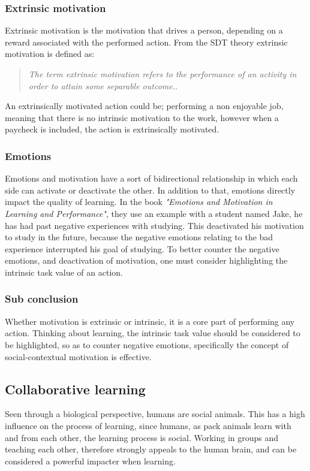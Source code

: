 \subsubsection*{Extrinsic motivation}
Extrinsic motivation is the motivation that drives a person, depending on a reward associated with the performed action. From the SDT theory extrinsic motivation is defined as: 
\begin{quote}
	\textit{The term extrinsic motivation refers to the performance of an activity in order to attain some separable outcome.}\cite[p.~71]{SDT}.\\
\end{quote}
An extrinsically motivated action could be; performing a non enjoyable job, meaning that there is no intrinsic motivation to the work, however when a paycheck is included, the action is extrinsically motivated\cite{SDT}.

\subsubsection*{Emotions}
Emotions and motivation have a sort of bidirectional relationship in which each side can activate or deactivate the other\cite[p.~66]{emotionsAndMotivation}. In addition to that, emotions directly impact the quality of learning\cite[p.~66]{emotionsAndMotivation}. In the book \textit{"Emotions and Motivation in Learning and Performance"}\cite{emotionsAndMotivation}, they use an example with a student named Jake, he has had past negative experiences with studying. This deactivated his motivation to study in the future, because the negative emotions relating to the bad experience interrupted his goal of studying\cite[p.~67]{emotionsAndMotivation}. To better counter the negative emotions, and deactivation of motivation, one must consider highlighting the intrinsic task value of an action\cite[p.68]{emotionsAndMotivation}.

\subsubsection*{Sub conclusion}
Whether motivation is extrinsic or intrinsic, it is a core part of performing any action. Thinking about learning, the intrinsic task value should be considered to be highlighted, so as to counter negative emotions, specifically the concept of social-contextual motivation is effective.

\subsection{Collaborative learning}\label{collabLearning}
 Seen through a biological perspective, humans are social animals\cite{laeringIPraksis}. This has a high influence on the process of learning, since humans, as pack animals learn with and from each other, the learning process is social\cite{laeringIPraksis}. Working in groups and teaching each other, therefore strongly appeals to the human brain, and can be considered a powerful impacter when learning\cite{laeringIPraksis}. 


